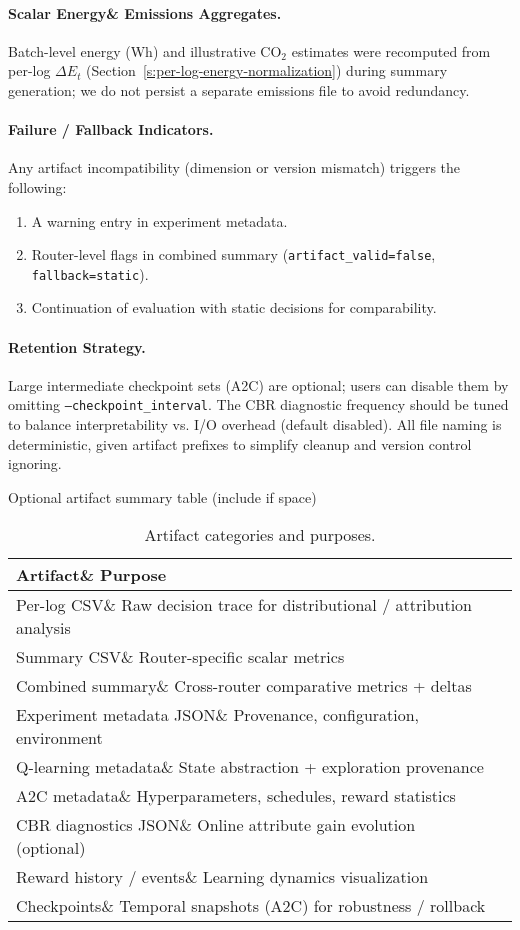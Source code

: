 \paragraph{Scalar Energy\& Emissions Aggregates.} Batch-level energy (Wh) and illustrative CO$_2$ estimates were recomputed from per-log \(\Delta E_t\) (Section~\ref{s:per-log-energy-normalization}) during summary generation; we do not persist a separate emissions file to avoid redundancy.

\paragraph{Failure / Fallback Indicators.} Any artifact incompatibility (dimension or version mismatch) triggers the following:
\begin{enumerate}
  \item A warning entry in experiment metadata.
  \item Router-level flags in combined summary (\texttt{artifact\_valid=false}, \texttt{fallback=static}).
  \item Continuation of evaluation with static decisions for comparability.
\end{enumerate}

\paragraph{Retention Strategy.} Large intermediate checkpoint sets (A2C) are optional; users can disable them by omitting \texttt{--checkpoint\_interval}. The CBR diagnostic frequency should be tuned to balance interpretability vs. I/O overhead (default disabled). All file naming is deterministic, given artifact prefixes to simplify cleanup and version control ignoring.

Optional artifact summary table (include if space)
\begin{table}[h]
\centering
\caption{Artifact categories and purposes.}
\label{tab:artifact-summary}
\begin{tabular}{ll}
\toprule
Artifact\& Purpose \\
\midrule
Per-log CSV\& Raw decision trace for distributional / attribution analysis \\
Summary CSV\& Router-specific scalar metrics \\
Combined summary\& Cross-router comparative metrics + deltas \\
Experiment metadata JSON\& Provenance, configuration, environment \\
Q-learning metadata\& State abstraction + exploration provenance \\
A2C metadata\& Hyperparameters, schedules, reward statistics \\
CBR diagnostics JSON\& Online attribute gain evolution (optional) \\
Reward history / events\& Learning dynamics visualization \\
Checkpoints\& Temporal snapshots (A2C) for robustness / rollback \\
\bottomrule
\end{tabular}
 \end{table}

